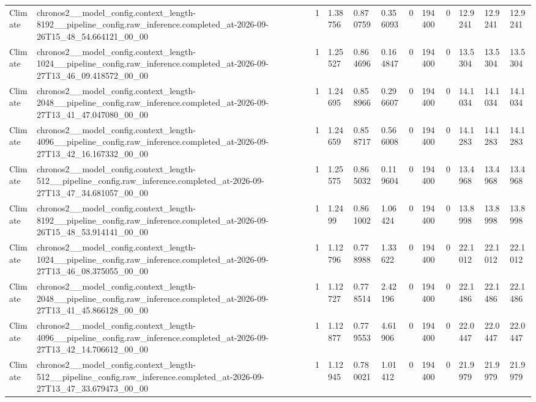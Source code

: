 \begin{tabular}{llllllllllll}
Climate & chronos2\_\_model\_config.context\_length-8192\_\_pipeline\_config.raw\_inference.completed\_at-2026-09-26T15\_48\_54.664121\_00\_00 & 1 & 1.38756 & 0.870759 & 0.356093 & 0 & 194400 & 0 & 12.9241 & 12.9241 & 12.9241 \\
Climate & chronos2\_\_model\_config.context\_length-1024\_\_pipeline\_config.raw\_inference.completed\_at-2026-09-27T13\_46\_09.418572\_00\_00 & 1 & 1.25527 & 0.864696 & 0.164847 & 0 & 194400 & 0 & 13.5304 & 13.5304 & 13.5304 \\
Climate & chronos2\_\_model\_config.context\_length-2048\_\_pipeline\_config.raw\_inference.completed\_at-2026-09-27T13\_41\_47.047080\_00\_00 & 1 & 1.24695 & 0.858966 & 0.296607 & 0 & 194400 & 0 & 14.1034 & 14.1034 & 14.1034 \\
Climate & chronos2\_\_model\_config.context\_length-4096\_\_pipeline\_config.raw\_inference.completed\_at-2026-09-27T13\_42\_16.167332\_00\_00 & 1 & 1.24659 & 0.858717 & 0.566008 & 0 & 194400 & 0 & 14.1283 & 14.1283 & 14.1283 \\
Climate & chronos2\_\_model\_config.context\_length-512\_\_pipeline\_config.raw\_inference.completed\_at-2026-09-27T13\_47\_34.681057\_00\_00 & 1 & 1.25575 & 0.865032 & 0.119604 & 0 & 194400 & 0 & 13.4968 & 13.4968 & 13.4968 \\
Climate & chronos2\_\_model\_config.context\_length-8192\_\_pipeline\_config.raw\_inference.completed\_at-2026-09-26T15\_48\_53.914141\_00\_00 & 1 & 1.2499 & 0.861002 & 1.06424 & 0 & 194400 & 0 & 13.8998 & 13.8998 & 13.8998 \\
Climate & chronos2\_\_model\_config.context\_length-1024\_\_pipeline\_config.raw\_inference.completed\_at-2026-09-27T13\_46\_08.375055\_00\_00 & 1 & 1.12796 & 0.778988 & 1.33622 & 0 & 194400 & 0 & 22.1012 & 22.1012 & 22.1012 \\
Climate & chronos2\_\_model\_config.context\_length-2048\_\_pipeline\_config.raw\_inference.completed\_at-2026-09-27T13\_41\_45.866128\_00\_00 & 1 & 1.12727 & 0.778514 & 2.42196 & 0 & 194400 & 0 & 22.1486 & 22.1486 & 22.1486 \\
Climate & chronos2\_\_model\_config.context\_length-4096\_\_pipeline\_config.raw\_inference.completed\_at-2026-09-27T13\_42\_14.706612\_00\_00 & 1 & 1.12877 & 0.779553 & 4.61906 & 0 & 194400 & 0 & 22.0447 & 22.0447 & 22.0447 \\
Climate & chronos2\_\_model\_config.context\_length-512\_\_pipeline\_config.raw\_inference.completed\_at-2026-09-27T13\_47\_33.679473\_00\_00 & 1 & 1.12945 & 0.780021 & 1.01412 & 0 & 194400 & 0 & 21.9979 & 21.9979 & 21.9979 \\

\end{tabular}
